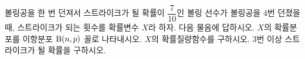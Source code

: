 볼링공을 한 번 던져서 스트라이크가 될 확률이 $\dfrac{7}{10}$인 볼링 선수가 볼링공을 $4$번 던졌을 때, 스트라이크가 되는 횟수를 확률변수 $X$라 하자. 다음 물음에 답하시오.
 $X$의 확률분포를 이항분포 $\mathrm{B}(n{,}\mkern3mu\mathopen{}p)$ 꼴로 나타내시오.
 $X$의 확률질량함수를 구하시오.
 $3$번 이상 스트라이크가 될 확률을 구하시오.
